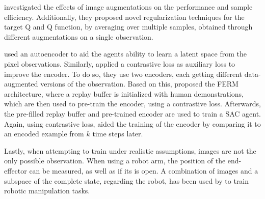 \citeauthor{kostrikovImageAugmentationAll2021} \cite{kostrikovImageAugmentationAll2021} investigated the effects of image augmentations on the performance and sample efficiency. Additionally, they proposed novel regularization techniques for the target Q and Q function, by averaging over multiple samples, obtained through different augmentations on a single observation.

\citeauthor{yaratsImprovingSampleEfficiency2020} \cite{yaratsImprovingSampleEfficiency2020} used an autoencoder to aid the agents ability to learn a latent space from the pixel observations. Similarly, \citeauthor{srinivasCURLContrastiveUnsupervised2020} \cite{srinivasCURLContrastiveUnsupervised2020} applied a contrastive loss as auxiliary loss to improve the encoder. To do so, they use two encoders, each getting different data-augmented versions of the observation. Based on this, \citeauthor{zhanFrameworkEfficientRobotic2020} \cite{zhanFrameworkEfficientRobotic2020} proposed the FERM architecture, where a replay buffer is initialized with human demonstrations, which are then used to pre-train the encoder, using a contrastive loss. Afterwards, the pre-filled replay buffer and pre-trained encoder are used to train a SAC agent. Again, using contrastive loss, \citeauthor{stookeDecouplingRepresentationLearning} \cite{stookeDecouplingRepresentationLearning} aided the training of the encoder by comparing it to an encoded example from $k$ time steps later.

Lastly, when attempting to train under realistic assumptions, images are not the only possible observation. When using a robot arm, the position of the end-effector can be measured, as well as if its is open. A combination of images and a subspace of the complete state, regarding the robot, has been used by \citeauthor{kalashnikovQTOptScalableDeep2018} \cite{kalashnikovQTOptScalableDeep2018} to train robotic manipulation tasks.